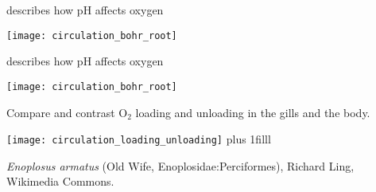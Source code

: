 \documentclass[t,handout]{beamer}  %
\begin{document}
\begin{frame}[c,plain]{ describes how pH affects oxygen }

\centering
\texttt{[image: circulation\_bohr\_root]}
\pause


\end{frame}


\begin{frame}[c,plain]{ describes how pH affects oxygen }

\centering
\texttt{[image: circulation\_bohr\_root]}
\pause


\end{frame}


\begin{frame}[c,plain]{Compare and contrast O$_2$ loading and unloading in the gills and the body.}

\vspace{\baselineskip}
\texttt{[image: circulation\_loading\_unloading]}
\vskip0pt plus 1filll

\hfill\tiny\textit{Enoplosus armatus} (Old Wife, Enoplosidae:Perciformes), Richard Ling, Wikimedia Commons.
\end{frame}
\end{document}
